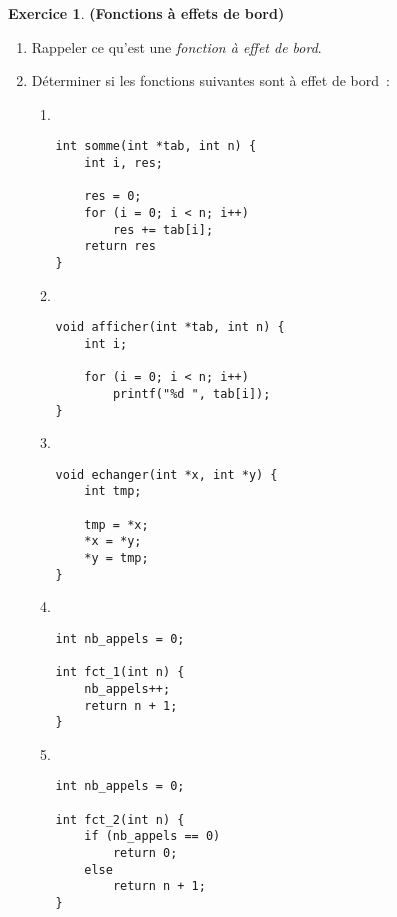\documentclass[12pt]{article}
\theoremstyle{definition}
\newtheorem{Exercice}{Exercice}
\begin{document}
\begin{Exercice} {\bf (Fonctions à effets de bord)}\smallskip

\begin{enumerate}
    \item Rappeler ce qu'est une {\em fonction à effet de bord}.
    \smallskip

    \item Déterminer si les fonctions suivantes sont à effet de bord~:
    \begin{multicols}{2}
        \begin{enumerate}
            \item ~
\begin{lstlisting}
int somme(int *tab, int n) {
    int i, res;

    res = 0;
    for (i = 0; i < n; i++)
        res += tab[i];
    return res
}
\end{lstlisting}
            \bigskip
            \bigskip
            \bigskip

            \item ~
\begin{lstlisting}
void afficher(int *tab, int n) {
    int i;

    for (i = 0; i < n; i++)
        printf("%d ", tab[i]);
}
\end{lstlisting}
            \bigskip
            \bigskip
            \bigskip

            \item ~
\begin{lstlisting}
void echanger(int *x, int *y) {
    int tmp;

    tmp = *x;
    *x = *y;
    *y = tmp;
}
\end{lstlisting}
            \bigskip

            \item ~
\begin{lstlisting}
int nb_appels = 0;

int fct_1(int n) {
    nb_appels++;
    return n + 1;
}
\end{lstlisting}
            \medskip

            \item ~
\begin{lstlisting}
int nb_appels = 0;

int fct_2(int n) {
    if (nb_appels == 0)
        return 0;
    else
        return n + 1;
}
\end{lstlisting}


\end{enumerate}
\end{multicols}
\end{enumerate}
\end{Exercice}
\end{document}

